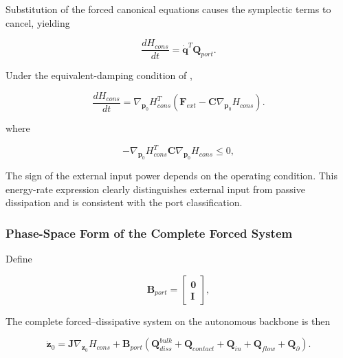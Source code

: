 Substitution of the forced canonical equations causes the symplectic terms to cancel, yielding

\begin{equation}
\label{eq:hamiltonian-3-37}
\boxed{\frac{dH_{cons}}{dt} = {\dot{\mathbf{q}}}^{T}\mathbf{Q}_{port}.}
\end{equation}

Under the equivalent-damping condition of ,

\begin{equation}
\label{eq:hamiltonian-3-38}
\boxed{\frac{dH_{cons}}{dt} = \nabla_{\mathbf{p}_{0}}H_{cons}^{T}\left( \mathbf{F}_{ext} - \mathbf{C}\nabla_{\mathbf{p}_{0}}H_{cons} \right).}
\end{equation}

where

\begin{equation}
\label{eq:hamiltonian-3-39}
- \nabla_{\mathbf{p}_{0}}H_{cons}^{T}\mathbf{C}\nabla_{\mathbf{p}_{0}}H_{cons} \leq 0,
\end{equation}

The sign of the external input power depends on the operating condition. This energy-rate expression clearly distinguishes external input from passive dissipation and is consistent with the port classification.

\subsubsection{Phase-Space Form of the Complete Forced System}\label{sec:hamiltonian-3-4-4}

Define

\begin{equation}
\label{eq:hamiltonian-3-40}
\mathbf{B}_{port} = \begin{bmatrix}
\mathbf{0} \\
\mathbf{I}
\end{bmatrix},
\end{equation}

The complete forced--dissipative system on the autonomous backbone is then

\begin{equation}
\label{eq:hamiltonian-3-41}
\boxed{{\dot{\mathbf{z}}}_{0} = \mathbf{J}\nabla_{\mathbf{z}_{0}}H_{cons} + \mathbf{B}_{port}\left( \mathbf{Q}_{diss}^{bulk} + \mathbf{Q}_{contact} + \mathbf{Q}_{in} + \mathbf{Q}_{flow} + \mathbf{Q}_{\partial} \right).}
\end{equation}

